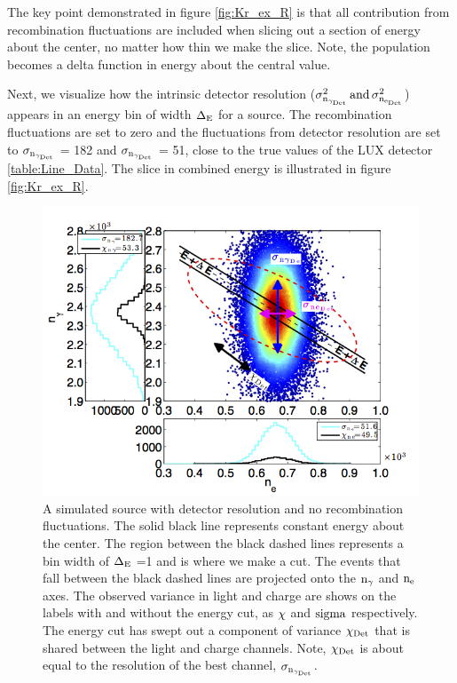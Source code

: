 \noindent The key point demonstrated in figure \ref{fig:Kr_ex_R} is that all contribution from recombination fluctuations are included when slicing out a section of energy about the center, no matter how thin we make the slice. Note, the population becomes a delta function in energy about the central value.

Next, we visualize how the intrinsic detector resolution ($\rm \sigma_{n_{\gamma_{Det}}}^2 \,and\, \sigma_{n_{e_{Det}}}^2 $) appears in an energy bin of width $\rm \Delta_E$ for a \KrCal source. The recombination fluctuations are set to zero and the fluctuations from detector resolution are set to $\rm \sigma_{n_{\gamma_{Det}}}$ = 182 and $\rm \sigma_{n_{\gamma_{Det}}}$ = 51, close to the true values of the LUX detector \ref{table:Line_Data}. The slice in combined energy is illustrated in figure \ref{fig:Kr_ex_R}.

\renewcommand{\baselinestretch}{1}
\small\normalsize
 \begin{figure}[h!]\centering
\includegraphics[width=160mm]{Chapter_Flucs/Figures/Ex_Plots/EX_Stat_Kr_.png}
\caption{A simulated \KrCal source with detector resolution and no recombination fluctuations. The solid black line represents constant energy about the center. The region between the black dashed lines represents a bin width of $\rm \Delta_E$ =1 and is where we make a cut. The events that fall between the black dashed lines are projected onto the $\rm n_\gamma$ and $\rm n_e$ axes. The observed variance in light and charge are shows on the labels with and without the energy cut, as $\rm \chi$ and $\rm sigma$ respectively. The energy cut has swept out a component of variance $\rm \chi_{Det}$ that is shared between the light and charge channels. Note, $\rm \chi_{Det}$ is about equal to the resolution of the best channel, $\rm \sigma_{n_{\gamma_{Det}}}$. }
\label{fig:Kr_ex_Stat}
\end{figure}
\renewcommand{\baselinestretch}{2}
\small\normalsize


